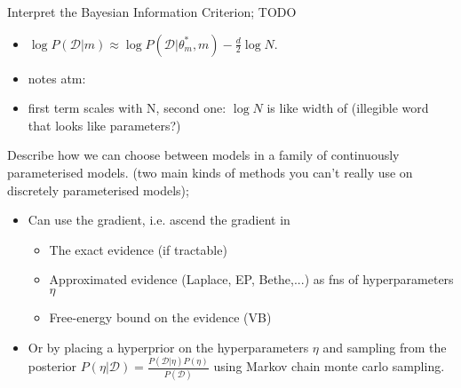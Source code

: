 \documentclass{article}
\begin{document}
Interpret the Bayesian Information Criterion; TODO \begin{itemize}
    \item $\log P(\mathcal{D}|m)\approx \log P(\mathcal{D}|\theta^*_m, m)-\frac{d}{2}\log N$.
    \item notes atm:
    \item first term scales with N, second one: $\log N$ is like width of (illegible word that looks like parameters?)
\end{itemize}

Describe how we can choose between models in a family of continuously parameterised models. (two main kinds of methods you can't really use on discretely parameterised models); \begin{itemize}
    \item Can use the gradient, i.e. ascend the gradient in \begin{itemize}
        \item The exact evidence (if tractable)
        \item Approximated evidence (Laplace, EP, Bethe,...) as fns of hyperparameters $\eta$
        \item Free-energy bound on the evidence (VB)
    \end{itemize}
    \item Or by placing a hyperprior on the hyperparameters $\eta$ and sampling from the posterior $P(\eta|\mathcal{D})=\frac{P(\mathcal{D}|\eta)P(\eta)}{P(\mathcal{D})}$ using Markov chain monte carlo sampling.
\end{itemize}

\end{document}

